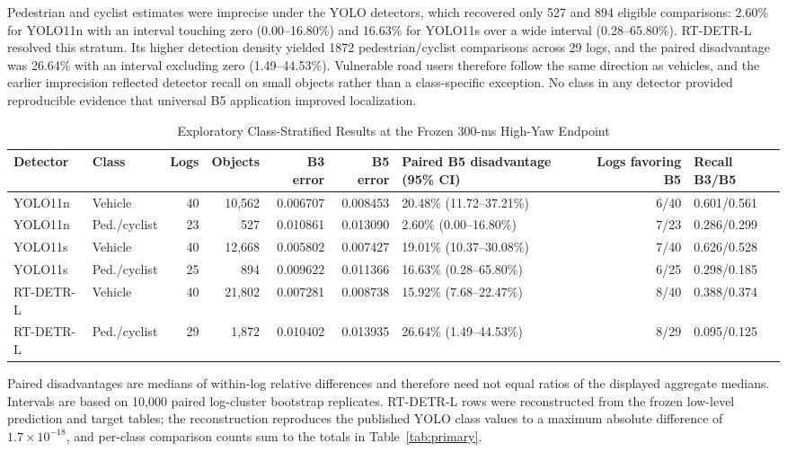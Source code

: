 \documentclass[journal]{IEEEtran}
\begin{document}
Pedestrian and cyclist estimates were imprecise under the YOLO detectors, which recovered only 527 and 894 eligible comparisons: 2.60\% for YOLO11n with an interval touching zero (0.00--16.80\%) and 16.63\% for YOLO11s over a wide interval (0.28--65.80\%). RT-DETR-L resolved this stratum. Its higher detection density yielded 1872 pedestrian/cyclist comparisons across 29 logs, and the paired disadvantage was 26.64\% with an interval excluding zero (1.49--44.53\%). Vulnerable road users therefore follow the same direction as vehicles, and the earlier imprecision reflected detector recall on small objects rather than a class-specific exception. No class in any detector provided reproducible evidence that universal B5 application improved localization.

\begin{table}[!t]
\caption{Exploratory Class-Stratified Results at the Frozen 300-ms High-Yaw Endpoint}
\label{tab:class}
\centering
\footnotesize
\begin{tabular}{@{}llrrrrlrl@{}}
\toprule
Detector & Class & Logs & Objects & B3 error & B5 error & Paired B5 disadvantage (95\% CI) & Logs favoring B5 & Recall B3/B5 \\
\midrule
YOLO11n & Vehicle & 40 & 10,562 & 0.006707 & 0.008453 & 20.48\% (11.72--37.21\%) & 6/40 & 0.601/0.561 \\
YOLO11n & Ped./cyclist & 23 & 527 & 0.010861 & 0.013090 & 2.60\% (0.00--16.80\%) & 7/23 & 0.286/0.299 \\
YOLO11s & Vehicle & 40 & 12,668 & 0.005802 & 0.007427 & 19.01\% (10.37--30.08\%) & 7/40 & 0.626/0.528 \\
YOLO11s & Ped./cyclist & 25 & 894 & 0.009622 & 0.011366 & 16.63\% (0.28--65.80\%) & 6/25 & 0.298/0.185 \\
RT-DETR-L & Vehicle & 40 & 21,802 & 0.007281 & 0.008738 & 15.92\% (7.68--22.47\%) & 8/40 & 0.388/0.374 \\
RT-DETR-L & Ped./cyclist & 29 & 1,872 & 0.010402 & 0.013935 & 26.64\% (1.49--44.53\%) & 8/29 & 0.095/0.125 \\
\bottomrule
\end{tabular}
\begin{minipage}{0.98\textwidth}
\vspace{1mm}\footnotesize
Paired disadvantages are medians of within-log relative differences and therefore need not equal ratios of the displayed aggregate medians. Intervals are based on 10,000 paired log-cluster bootstrap replicates. RT-DETR-L rows were reconstructed from the frozen low-level prediction and target tables; the reconstruction reproduces the published YOLO class values to a maximum absolute difference of $1.7\times10^{-18}$, and per-class comparison counts sum to the totals in Table~\ref{tab:primary}.
\end{minipage}
\end{table}
\end{document}
